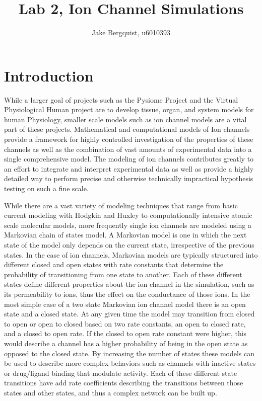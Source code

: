 \documentclass[11pt]{article}
\begin{document}
\title{Lab 2, Ion Channel Simulations}
\author{Jake Bergquist, u6010393}
\maketitle
\tableofcontents
\newpage

\section{Introduction}
\par{}
While a larger goal of projects such as the Pysiome Project and the Virtual Physiological Human project are to develop tissue, organ, and system models for human Physiology, smaller scale models such as ion channel models are a vital part of these projects.\cite{Fink2011} Mathematical and computational models of Ion channels provide a framework for highly controlled investigation of the properties of these channels as well as the combination of vast amounts of experimental data into a single comprehensive model.  The modeling of ion channels contributes greatly to an effort to integrate and interpret experimental data as well as provide a highly detailed way to perform precise and otherwise technically impractical hypothesis testing on such a fine scale.
\par{}
While there are a vast variety of modeling techniques that range from basic current modeling with Hodgkin and Huxley to computationally intensive atomic scale molecular models, more frequently single ion channels are modeled using a Markovian chain of states model.\cite{Fink2011}\cite{Kojima2018a}
A Markovian model is one in which the next state of the model only depends on the current state, irrespective of the previous states. In the case of ion channels, Markovian models are typically structured into different closed and open states with rate constants that determine the probability of transitioning from one state to another. Each of these different states define different properties about the ion channel in the simulation, such as its permeability to ions, thus the effect on the conductance of those ions.\cite{Fink2011} In the most simple case of a two state Markovian ion channel model there is an open state and a closed state. At any given time the model may transition from closed to open or open to closed based on two rate constants, an open to closed rate, and a closed to open rate. If the closed to open rate constant were higher, this would describe a channel has a higher probability of being in the open state as opposed to the closed state. By increasing the number of states these models can be used to describe more complex behaviors such as channels with inactive states or drug/ligand binding that modulate activity. Each of these different state transitions have add rate coefficients describing the transitions between those states and other states, and thus a complex network can be built up.
\end{document}
